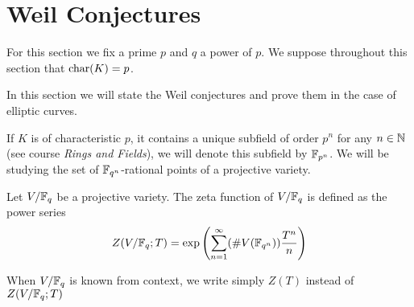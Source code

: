 \section{Weil Conjectures}
\label{sec:finite-fields}

For this section we fix a prime $p$ and $q$ a power of $p$.
We suppose throughout this section that $\operatorname{char}(K) = p$.

In this section we will state the Weil conjectures and prove them in the
case of elliptic curves.

If $K$ is of characteristic $p$,
it contains a unique subfield of order $p^n$ for any $n \in \mathbb{N}$ (see
course \emph{Rings and Fields}), we will denote this subfield by $\mathbb{F}_{p^n}$.
We will be studying the set of
$\mathbb{F}_{q^n}$-rational points of a projective variety.

\begin{definition}
	Let $V/\mathbb{F}_q$ be a projective variety.
	The zeta function of $V/\mathbb{F}_q$ is defined as the power series
	\begin{equation*}
		Z(V/\mathbb{F}_q; T) = \exp\left(\sum_{n=1}^\infty (\#V(\mathbb{F}_{q^n}))
		\frac{T^n}{n}\right)
	\end{equation*}
\end{definition}

\begin{notation}
	When $V/\mathbb{F}_q$ is known from context, we write simply $Z(T)$
	instead of $Z(V/\mathbb{F}_q; T)$
\end{notation}

